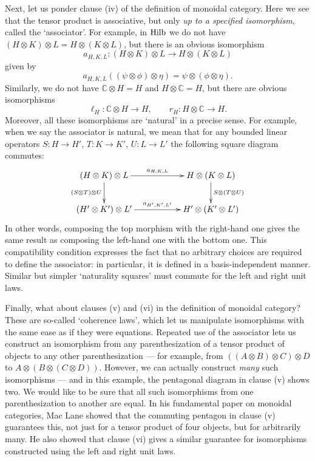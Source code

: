 \documentclass{article}
\newcommand{\Hilb}{{\rm Hilb}}
\newcommand{\C}{{\mathbb C}}
\renewcommand{\to}{\rightarrow}
\newcommand{\maps}{\colon}
\newcommand{\tensor}{\otimes}
\begin{document}
Next, let us ponder clause (iv) of the definition of monoidal
category.  Here we see that the tensor product is associative,
but only {\it up to a specified isomorphism}, called the `associator'.
For example, in $\Hilb$ we do not have 
$(H \tensor K) \tensor L = H \tensor (K \tensor L)$, 
but there is an obvious isomorphism
\[         a_{H,K,L} \maps (H \tensor K) \tensor L \to 
H \tensor (K \tensor L) \]
given by
\[          a_{H,K,L} ((\psi \tensor \phi) \tensor \eta) = 
                        \psi \tensor (\phi \tensor \eta) .\]
Similarly, we do not have $\C \tensor H = H$ and $H \tensor \C = H$,
but there are obvious isomorphisms
\[        \ell_H \maps \C \tensor H \to H, \qquad
          r_H \maps H \tensor \C \to H  .\]
Moreover, all these isomorphisms are `natural' in a precise sense.
For example, when we say the associator is natural, we mean that
for any bounded linear operators $S \maps H \to H'$, $T \maps K \to K'$,
$U \maps L \to L'$ the following square diagram commutes:
\[
\xymatrix{
 (H \tensor K) \tensor L
  \ar[rr]^{a_{H,K,L}}
  \ar[d]_{(S \tensor T) \tensor U}
&&  H \tensor (K \tensor L)
   \ar[d]^{S \tensor (T \tensor U)}     \\
 (H' \tensor K') \tensor L'
   \ar[rr]^{a_{H',K',L'}}
&&  H' \tensor (K' \tensor L') }
\]
In other words, composing the top morphism with the right-hand one
gives the same result as composing the left-hand one with the bottom
one.  This compatibility condition expresses the fact that no arbitrary
choices are required to define the associator: in particular, it
is defined in a basis-independent manner.  Similar but simpler 
`naturality squares' must commute for the left and right unit laws.  

Finally, what about clauses (v) and (vi) in the definition of monoidal
category?  These are so-called `coherence laws', which let us
manipulate isomorphisms with the same ease as if they were equations.
Repeated use of the associator lets us construct an isomorphism from
any parenthesization of a tensor product of objects to any other
parenthesization --- for example, from $((A \tensor B) \tensor C)
\tensor D$ to $A \tensor (B \tensor (C \tensor D))$.  However, we can
actually construct {\it many} such isomorphisms --- and in this
example, the pentagonal diagram in clause (v) shows two.  We would
like to be sure that all such isomorphisms from one parenthesization
to another are equal.  In his fundamental paper on monoidal categories, 
Mac Lane \cite{MacLane} showed that the commuting pentagon in clause 
(v) guarantees this, not just for a tensor product of four objects,
but for arbitrarily many.  He also showed that clause (vi) gives a
similar guarantee for isomorphisms constructed using the left and
right unit laws.
\end{document}
